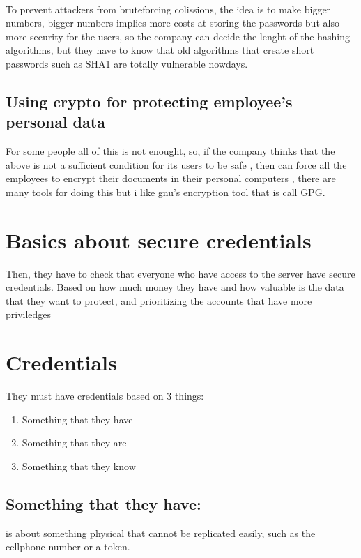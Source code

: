 \documentclass[10pt,a4paper]{article} %
\begin{document}
            \\ To prevent attackers from bruteforcing colissions, the idea is
            to make bigger numbers, bigger numbers implies more costs at
            storing the passwords but also more security for the users, so the
            company can decide the lenght of the hashing algorithms, but they
            have to know that old algorithms that create short passwords such
            as SHA1 are totally vulnerable nowdays.

        \subsection{Using crypto for protecting employee's personal data}

            For some people all of this is not enought, so, if the company
            thinks that the above is not a sufficient condition for its users
            to be safe , then can force all the employees to encrypt their
            documents in their personal computers , there are many tools for
            doing this but i like gnu's encryption tool that is call GPG.

    \section{Basics about secure credentials}
        
        Then,
        they have to check that everyone who have access to the server have
        secure credentials. Based on how much money they have and how valuable
        is the data that they want to protect, and prioritizing the accounts
        that have more priviledges 
               
        \section{Credentials}
            They must have credentials based on 3 things:
        \begin{enumerate}
            \item {Something that they have} 
            \item {Something that they are} 
            \item {Something that they know} 
        \end{enumerate}
        \subsection{Something that they have:}
            is about something physical that cannot be replicated
            easily, such as the cellphone number or a token. 
\end{document}
